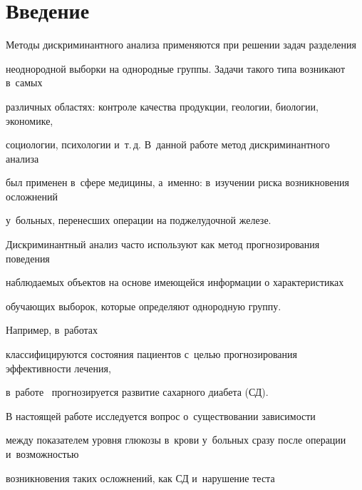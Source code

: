 









      \thispagestyle{headings}

 






\section{Введение}



Методы дискриминантного анализа применяются при решении задач разделения 

неоднородной выборки на однородные группы. Задачи такого типа возникают в~самых 

различных областях: контроле качества продукции, геологии, биологии, экономике, 

социологии, психологии и~т.\,д. В~данной работе метод дискриминантного анализа 

был применен в~сфере медицины, а~именно: в~изучении риска возникновения осложнений 

у~больных, перенесших операции на поджелудочной железе.



Дискриминантный анализ часто используют как метод прогнозирования поведения 

наблюдаемых объектов на основе имеющейся информации о характеристиках 

обучающих выборок, которые определяют однородную группу.

Например, в~работах~\cite{zakh7 , draniz9, draniz13}

классифицируются состояния пациентов с~целью прогнозирования эффективности лечения, 

в~работе~\cite{zakharova3} прогнозируется развитие сахарного диабета (СД).



В настоящей работе исследуется вопрос о~существовании зависимости

между показателем уровня глюкозы в~крови у~больных сразу после операции и~возможностью 

возникновения таких осложнений, как СД и~нарушение теста 

